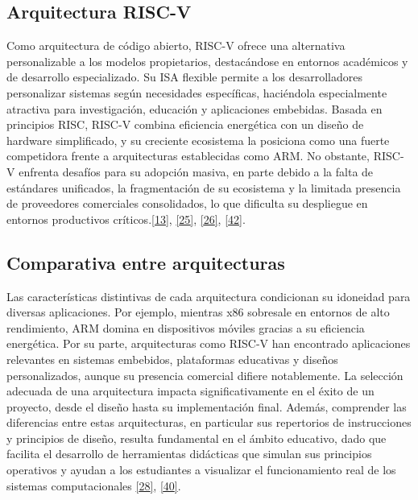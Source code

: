 \documentclass[12pt,oneside]{templates/unerthesis}
\begin{document}
\hypertarget{arquitectura-risc-v}{%
\subsection{Arquitectura RISC-V}\label{arquitectura-risc-v}}

Como arquitectura de código abierto, RISC-V ofrece una alternativa personalizable a los modelos propietarios, destacándose en entornos académicos y de desarrollo especializado. Su ISA flexible permite a los desarrolladores personalizar sistemas según necesidades específicas, haciéndola especialmente atractiva para investigación, educación y aplicaciones embebidas. Basada en principios RISC, RISC-V combina eficiencia energética con un diseño de hardware simplificado, y su creciente ecosistema la posiciona como una fuerte competidora frente a arquitecturas establecidas como ARM. No obstante, RISC-V enfrenta desafíos para su adopción masiva, en parte debido a la falta de estándares unificados, la fragmentación de su ecosistema y la limitada presencia de proveedores comerciales consolidados, lo que dificulta su despliegue en entornos productivos críticos.\protect\hyperlink{ref-hennessy2017computer}{{[}13{]}}, \protect\hyperlink{ref-waterman_risc-v_2014}{{[}25{]}}, \protect\hyperlink{ref-harris2015digital}{{[}26{]}}, \protect\hyperlink{ref-patterson2016computer}{{[}42{]}}.

\hypertarget{comparativa-entre-arquitecturas}{%
\subsection{Comparativa entre arquitecturas}\label{comparativa-entre-arquitecturas}}

Las características distintivas de cada arquitectura condicionan su idoneidad para diversas aplicaciones. Por ejemplo, mientras x86 sobresale en entornos de alto rendimiento, ARM domina en dispositivos móviles gracias a su eficiencia energética. Por su parte, arquitecturas como RISC-V han encontrado aplicaciones relevantes en sistemas embebidos, plataformas educativas y diseños personalizados, aunque su presencia comercial difiere notablemente. La selección adecuada de una arquitectura impacta significativamente en el éxito de un proyecto, desde el diseño hasta su implementación final. Además, comprender las diferencias entre estas arquitecturas, en particular sus repertorios de instrucciones y principios de diseño, resulta fundamental en el ámbito educativo, dado que facilita el desarrollo de herramientas didácticas que simulan sus principios operativos y ayudan a los estudiantes a visualizar el funcionamiento real de los sistemas computacionales \protect\hyperlink{ref-patterson_computer_2014}{{[}28{]}}, \protect\hyperlink{ref-arm_evolution_2025}{{[}40{]}}.
\end{document}
